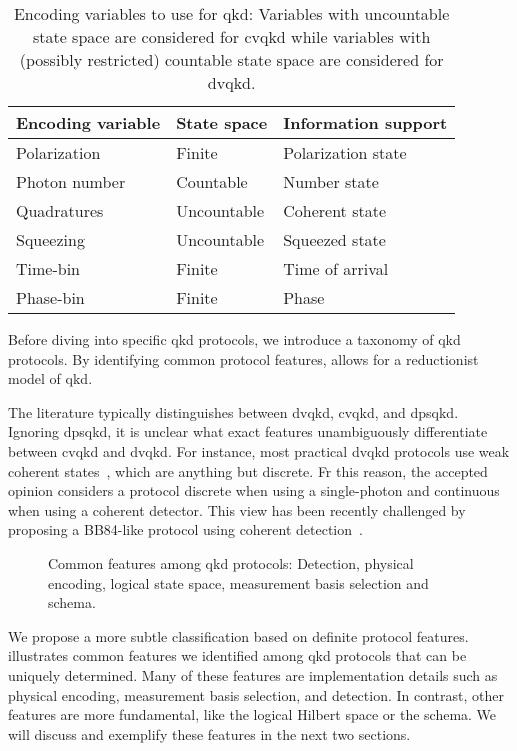 \begin{table}[htb]
	\centering
	\begin{tabular}{lll}
		\toprule
		Encoding variable & State space & Information support \\
		\midrule
		Polarization & Finite & Polarization state \\
		Photon number & Countable & Number state \\
		Quadratures & Uncountable & Coherent state \\
		Squeezing & Uncountable & Squeezed state \\
		Time-bin & Finite & Time of arrival \\
		Phase-bin & Finite & Phase \\
		\bottomrule
	\end{tabular}
	\caption{Encoding variables to use for \gls{qkd}: Variables with uncountable state space are considered for \gls{cvqkd} while variables with (possibly restricted) countable state space are considered for \gls{dvqkd}.}
\end{table}

Before diving into specific \gls{qkd} protocols, we introduce a taxonomy of \gls{qkd} protocols.
By identifying common protocol features, allows for a reductionist model of \gls{qkd}.

The literature typically distinguishes between \gls{dvqkd}, \gls{cvqkd}, and \gls{dpsqkd}.
Ignoring \gls{dpsqkd}, it is unclear what exact features unambiguously differentiate between \gls{cvqkd} and \gls{dvqkd}.
For instance, most practical \gls{dvqkd} protocols use weak coherent states~\cite{Duvsek2006}, which are anything but discrete.
Fr this reason, the accepted opinion considers a protocol discrete when using a single-photon and continuous when using a coherent detector.
This view has been recently challenged by proposing a BB84-like protocol using coherent detection~\cite{Qi2021}.
\begin{figure}[htb]
	\centering
	
	\caption{Common features among \gls{qkd} protocols: Detection, physical encoding, logical state space, measurement basis selection and schema.}\label{fig:qkd_classification}
\end{figure}
We propose a more subtle classification based on definite protocol features.
 illustrates common features we identified among \gls{qkd} protocols that can be uniquely determined.
Many of these features are implementation details such as physical encoding, measurement basis selection, and detection.
In contrast, other features are more fundamental, like the logical Hilbert space or the schema.
We will discuss and exemplify these features in the next two sections.

